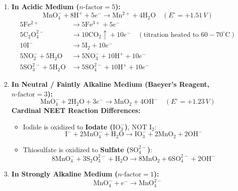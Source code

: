 \documentclass[10pt,a4paper]{article}
\begin{document}
\begin{formulabox}
\begin{enumerate}
  \item \textbf{In Acidic Medium ($n\text{-factor} = 5$):}
  \begin{equation}
    \mathrm{MnO_4^-} + 8\mathrm{H^+} + 5e^- \longrightarrow \mathrm{Mn^{2+}} + 4\mathrm{H_2O} \quad (E^\circ = +1.51\,\si{V})
  \end{equation}
  \begin{align}
    5\mathrm{Fe^{2+}} &\longrightarrow 5\mathrm{Fe^{3+}} + 5e^- \\
    5\mathrm{C_2O_4^{2-}} &\longrightarrow 10\mathrm{CO_2\uparrow} + 10e^- \quad (\text{titration heated to } 60-70^\circ\text{C}) \\
    10\mathrm{I^-} &\longrightarrow 5\mathrm{I_2} + 10e^- \\
    5\mathrm{NO_2^-} + 5\mathrm{H_2O} &\longrightarrow 5\mathrm{NO_3^-} + 10\mathrm{H^+} + 10e^- \\
    5\mathrm{SO_3^{2-}} + 5\mathrm{H_2O} &\longrightarrow 5\mathrm{SO_4^{2-}} + 10\mathrm{H^+} + 10e^-
  \end{align}
  \item \textbf{In Neutral / Faintly Alkaline Medium (Baeyer's Reagent, $n\text{-factor} = 3$):}
  \begin{equation}
    \mathrm{MnO_4^-} + 2\mathrm{H_2O} + 3e^- \longrightarrow \mathbf{\mathrm{MnO_2}} + 4\mathrm{OH^-} \quad (E^\circ = +1.23\,\si{V})
  \end{equation}
  \textbf{Cardinal NEET Reaction Differences:}
  \begin{itemize}
    \item Iodide is oxidized to \textbf{Iodate ($\mathrm{IO_3^-}$)}, NOT $\mathrm{I_2}$:
    \begin{equation}
      \mathrm{I^-} + 2\mathrm{MnO_4^-} + \mathrm{H_2O} \longrightarrow \mathbf{\mathrm{IO_3^-}} + 2\mathrm{MnO_2} + 2\mathrm{OH^-}
    \end{equation}
    \item Thiosulfate is oxidized to \textbf{Sulfate ($\mathrm{SO_4^{2-}}$)}:
    \begin{equation}
      8\mathrm{MnO_4^-} + 3\mathrm{S_2O_3^{2-}} + \mathrm{H_2O} \longrightarrow 8\mathrm{MnO_2} + 6\mathrm{SO_4^{2-}} + 2\mathrm{OH^-}
    \end{equation}
  \end{itemize}
  \item \textbf{In Strongly Alkaline Medium ($n\text{-factor} = 1$):}
  \begin{equation}
    \mathrm{MnO_4^-} + e^- \longrightarrow \mathrm{MnO_4^{2-}}
  \end{equation}
\end{enumerate}
\end{formulabox}
\end{document}
